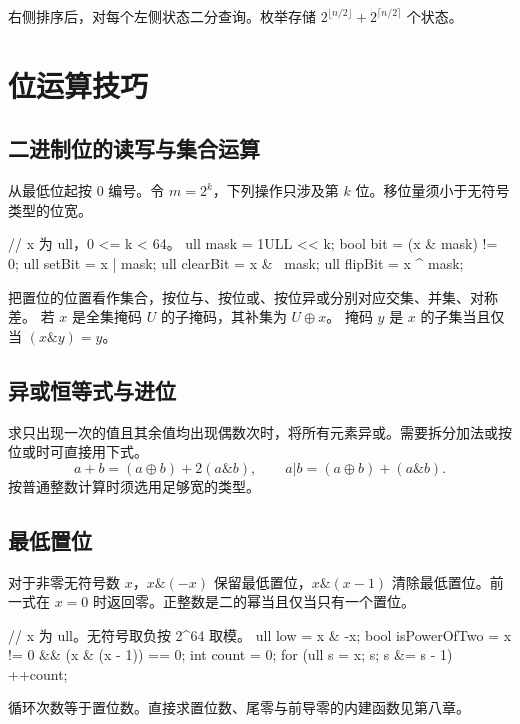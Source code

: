 右侧排序后，对每个左侧状态二分查询。枚举存储 $2^{\lfloor n/2\rfloor}+2^{\lceil n/2\rceil}$ 个状态。

\section{位运算技巧}

\subsection{二进制位的读写与集合运算}

从最低位起按 $0$ 编号。令 $m=2^k$，下列操作只涉及第 $k$ 位。移位量须小于无符号类型的位宽。

\begin{cppcode}
// x 为 ull，0 <= k < 64。
ull mask = 1ULL << k;
bool bit = (x & mask) != 0;
ull setBit = x | mask;
ull clearBit = x & ~mask;
ull flipBit = x ^ mask;
\end{cppcode}

把置位的位置看作集合，按位与、按位或、按位异或分别对应交集、并集、对称差。
若 $x$ 是全集掩码 $U$ 的子掩码，其补集为 $U\oplus x$。
掩码 $y$ 是 $x$ 的子集当且仅当 $(x\mathbin{\mathtt{\&}}y)=y$。

\subsection{异或恒等式与进位}

求只出现一次的值且其余值均出现偶数次时，将所有元素异或。需要拆分加法或按位或时可直接用下式。
\[
a+b=(a\oplus b)+2(a\mathbin{\mathtt{\&}}b),\qquad
a\mathbin{\mathtt{|}}b=(a\oplus b)+(a\mathbin{\mathtt{\&}}b).
\]
按普通整数计算时须选用足够宽的类型。

\subsection{最低置位}

对于非零无符号数 $x$，$x\mathbin{\mathtt{\&}}(-x)$ 保留最低置位，$x\mathbin{\mathtt{\&}}(x-1)$ 清除最低置位。前一式在 $x=0$ 时返回零。正整数是二的幂当且仅当只有一个置位。

\begin{cppcode}
// x 为 ull。无符号取负按 2^64 取模。
ull low = x & -x;
bool isPowerOfTwo = x != 0 && (x & (x - 1)) == 0;
int count = 0;
for (ull s = x; s; s &= s - 1) ++count;
\end{cppcode}

循环次数等于置位数。直接求置位数、尾零与前导零的内建函数见第八章。

